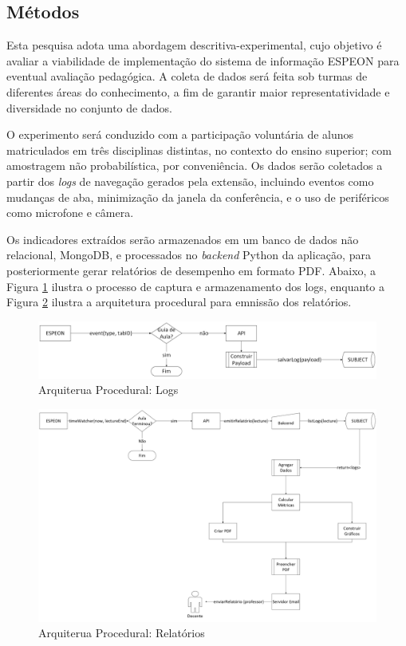 \subsection{Métodos}\label{sec:methods}
Esta pesquisa adota uma abordagem descritiva-experimental, cujo objetivo é avaliar a viabilidade de implementação do sistema de informação ESPEON para eventual avaliação pedagógica. A coleta de dados será feita sob turmas de diferentes áreas do conhecimento, a fim de garantir maior representatividade e diversidade no conjunto de dados.

O experimento será conduzido com a participação voluntária de alunos matriculados em três disciplinas distintas, no contexto do ensino superior; com amostragem não probabilística, por conveniência. Os dados serão coletados a partir dos \textit{logs} de navegação gerados pela extensão, incluindo eventos como mudanças de aba, minimização da janela da conferência, e o uso de periféricos como microfone e câmera.

Os indicadores extraídos serão armazenados em um banco de dados não relacional, MongoDB, e processados no \textit{backend} Python da aplicação, para posteriormente gerar relatórios de desempenho em formato PDF. Abaixo, a Figura \ref{fig:arquiteturaLogs} ilustra o processo de captura e armazenamento dos logs, enquanto a Figura \ref{fig:arquiteturaReports} ilustra a arquitetura procedural para emnissão dos relatórios.

\begin{figure}[ht]
    \centering
    \includegraphics[width=.97\textwidth]{assets/images/arquitetura.logs.png}
    \caption{Arquiterua Procedural: Logs}
    \label{fig:arquiteturaLogs}
\end{figure}

\begin{figure}[ht]
    \centering
    \includegraphics[width=.97\textwidth]{assets/images/arquitetura.reports.png}
    \caption{Arquiterua Procedural: Relatórios}
    \label{fig:arquiteturaReports}
\end{figure}

